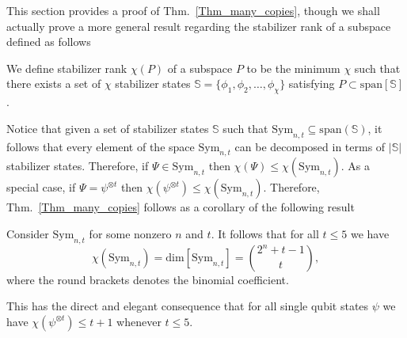 This section provides a proof of Thm.~\ref{Thm_many_copies}, though we shall actually prove a more general result regarding the stabilizer rank of a subspace defined as follows
\begin{dfn}
	We define stabilizer rank $\chi(P)$ of a subspace $P$ to be the minimum $\chi$ such that there exists a set of $\chi$ stabilizer states $\mathbb{S}=\{ \phi_1,  \phi_2, \ldots , \phi_\chi \}$ satisfying $P \subset \mathrm{span}[ \mathbb{S} ]$. 
\end{dfn}  
Notice that given a set of stabilizer states $\mathbb{S}$ such that $\mathrm{Sym}_{n,t} \subseteq \mathrm{span}(\mathbb{S}) $, it follows that every element of the space $\mathrm{Sym}_{n,t}$ can be decomposed in terms of $|\mathbb{S}|$ stabilizer states.  Therefore, if $\Psi \in \mathrm{Sym}_{n,t}$ then $\chi(\Psi) \leq \chi(\mathrm{Sym}_{n,t})$.   As a special case, if $\Psi = \psi^{\otimes t}$ then  $\chi(\psi^{\otimes t}) \leq \chi(\mathrm{Sym}_{n,t})$.  Therefore,  Thm.~\ref{Thm_many_copies} follows as a corollary of the following result
\begin{lemma}
	\label{symmetric}
	Consider $\mathrm{Sym}_{n,t}$ for some nonzero $n$ and $t$.  It follows that for all $t \leq 5$ we have
	\begin{equation}
		\label{symmetric_inequality}
	\chi( \mathrm{Sym}_{n,t} ) = \mathrm{dim}[\mathrm{Sym}_{n,t}] = \binom{2^n + t -1}{t} ,
	\end{equation}
	where the round brackets denotes the binomial coefficient.
\end{lemma}
This has the direct and elegant consequence that for all single qubit states $\psi$ we have $\chi( \psi ^{\otimes t}  ) \leq t+1$ whenever $t \leq 5 $. 

